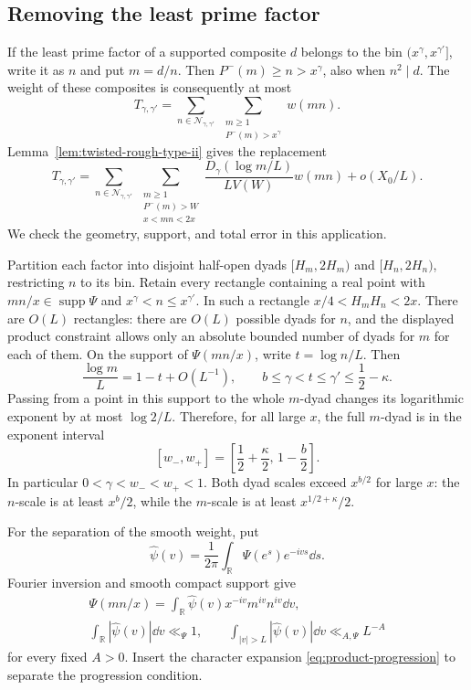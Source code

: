 \subsection{Removing the least prime factor}

If the least prime factor of a supported composite $d$ belongs to
the bin $(x^\gamma,x^{\gamma'}]$, write it as $n$ and put $m=d/n$.
Then $P^-(m)\ge n>x^\gamma$, also when $n^2\mid d$.  The weight of
these composites is consequently at most
\[
 T_{\gamma,\gamma'}=
 \sum_{n\in\mathcal N_{\gamma,\gamma'}}
       \ \sum_{\substack{m\ge1\\P^-(m)>x^\gamma}}w(mn).
\]
Lemma~\ref{lem:twisted-rough-type-ii} gives the replacement
\begin{equation}\label{eq:rough-replacement}
 T_{\gamma,\gamma'}=
 \sum_{n\in\mathcal N_{\gamma,\gamma'}}
       \ \sum_{\substack{m\ge1\\P^-(m)>W\\x<mn<2x}}
       \frac{D_\gamma(\log m/L)}{LV(W)}w(mn)
       +o(X_0/L).
\end{equation}
We check the geometry, support, and total error in this application.

Partition each factor into disjoint half-open dyads
$[H_m,2H_m)$ and $[H_n,2H_n)$, restricting $n$ to its bin.  Retain
every rectangle containing a real point with $mn/x\in\operatorname{supp}\Psi$
and $x^\gamma<n\le x^{\gamma'}$.  In such a rectangle
$x/4<H_mH_n<2x$.  There are $O(L)$ rectangles: there are $O(L)$
possible dyads for $n$, and the displayed product constraint allows
only an absolute bounded number of dyads for $m$ for each of them.
On the support of $\Psi(mn/x)$, write $t=\log n/L$.  Then
\begin{equation}\label{eq:bin-exponent-range}
 \frac{\log m}{L}=1-t+O(L^{-1}),
 \qquad b\le\gamma<t\le\gamma'\le\frac12-\kappa.
\end{equation}
Passing from a point in this support to the whole $m$-dyad changes
its logarithmic exponent by at most $\log2/L$.  Therefore, for all
large $x$, the full $m$-dyad is in the exponent interval
\[
 [w_-,w_+]=\left[\frac12+\frac\kappa2,\,1-\frac b2\right].
\]
In particular $0<\gamma<w_-<w_+<1$.  Both dyad scales exceed
$x^{b/2}$ for large $x$: the $n$-scale is at least $x^b/2$, while
the $m$-scale is at least $x^{1/2+\kappa}/2$.

For the separation of the smooth weight, put
\[
 \widehat\psi(v)=\frac1{2\pi}\int_{\mathbb R}\Psi(e^s)e^{-ivs}\dd s.
\]
Fourier inversion and smooth compact support give
\begin{equation}\label{eq:reservoir-fourier-separation}
 \begin{gathered}
 \Psi(mn/x)=\int_{\mathbb R}\widehat\psi(v)x^{-iv}m^{iv}n^{iv}\dd v,\\
 \int_{\mathbb R}|\widehat\psi(v)|\dd v\ll_\Psi1,
 \qquad
 \int_{|v|>L}|\widehat\psi(v)|\dd v\ll_{A,\Psi}L^{-A}
 \end{gathered}
\end{equation}
for every fixed $A>0$.  Insert the character expansion
\eqref{eq:product-progression} to separate the progression condition.

